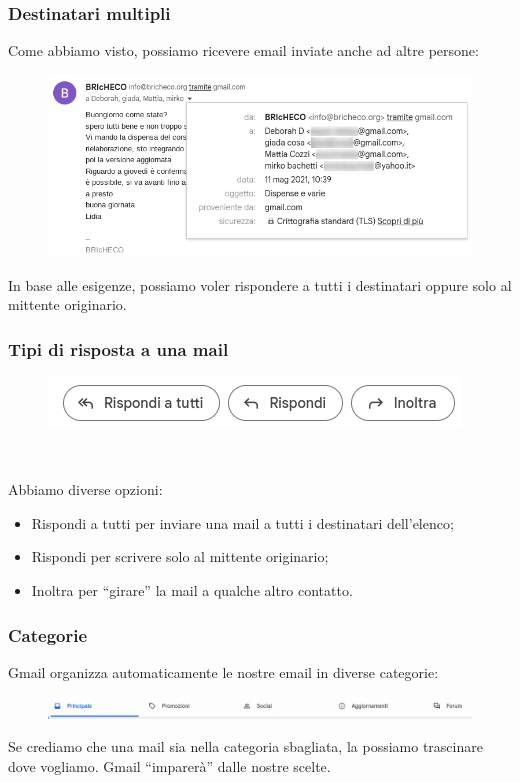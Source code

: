 \documentclass[]{beamer}
\begin{document}
\begin{frame}
\frametitle{Destinatari multipli}
Come abbiamo visto, possiamo ricevere email inviate anche ad altre persone:
\begin{figure}
  \includegraphics[width=.8\columnwidth]{img/gmaildestinatari.png}
\end{figure}\pause
In base alle esigenze, possiamo voler rispondere a tutti i destinatari oppure solo al mittente originario.
\end{frame}






\begin{frame}
\frametitle{Tipi di risposta a una mail}
\begin{figure}
  \includegraphics[width=.7\columnwidth]{img/risposte.png}
\end{figure}

~

Abbiamo diverse opzioni:
\begin{itemize}
  \item \alert{Rispondi a tutti} per inviare una mail a tutti i destinatari dell'elenco;\pause
  \item \alert{Rispondi} per scrivere solo al mittente originario;\pause
  \item \alert{Inoltra} per ``girare'' la mail a qualche altro contatto.
\end{itemize}
\end{frame}



\begin{frame}
\frametitle{Categorie}
Gmail organizza automaticamente le nostre email in diverse categorie:
\begin{figure}
  \includegraphics[width=\columnwidth]{img/gmailcategorie.png}
\end{figure}\pause

Se crediamo che una mail sia nella categoria sbagliata, la possiamo trascinare dove vogliamo. Gmail ``imparerà'' dalle nostre scelte.
\end{frame}
\end{document}

